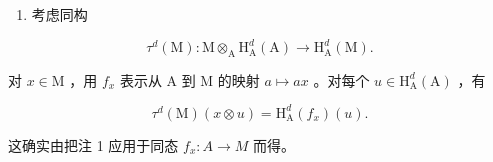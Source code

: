 \begin{enumerate}
\def\labelenumi{\arabic{enumi})}
\setcounter{enumi}{2}
\tightlist
\item
  考虑同构
\end{enumerate}

\[
\tau^ {d} (\mathrm{M}): \mathrm{M} \otimes_ {\mathrm{A}} \mathrm{H} _ {\mathrm{A}} ^ {d} (\mathrm{A}) \longrightarrow \mathrm{H} _ {\mathrm{A}} ^ {d} (\mathrm{M}).
\]

对 \(x \in \mathrm{M}\) ，用 \(f_x\) 表示从 A 到 M 的映射 \(a \mapsto ax\) 。对每个 \(u \in \mathrm{H}_{\mathrm{A}}^{d}(\mathrm{A})\) ，有

\[
\tau^ {d} (\mathrm{M}) (x \otimes u) = \mathrm{H} _ {\mathrm{A}} ^ {d} (f _ {x}) (u).
\]

这确实由把注 1 应用于同态 \(f_{x}:A\to M\) 而得。

